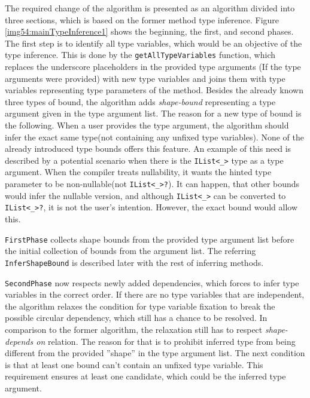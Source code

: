 The required change of the algorithm is presented as an algorithm divided into three sections, which is based on the former method type inference. 
Figure \ref{img54:mainTypeInference1} shows the beginning, the first, and second phases. 
The first step is to identify all type variables, which would be an objective of the type inference. 
This is done by the \texttt{getAllTypeVariables} function, which replaces the underscore placeholders in the provided type arguments (If the type arguments were provided) with new type variables and joins them with type variables representing type parameters of
the method.
Besides the already known three types of bound, the algorithm adds \textit{shape-bound} representing a type argument given in the type argument list.
The reason for a new type of bound is the following. 
When a user provides the type argument, the algorithm should infer the exact same type(not containing any unfixed type variables). 
None of the already introduced type bounds offers this feature. 
An example of this need is described by a potential scenario when there is the \texttt{IList<\_>} type as a type argument. 
When the compiler treats nullability, it wants the hinted type parameter to be non-nullable(not \texttt{IList<\_>?}). 
It can happen, that other bounds would infer the nullable version, and although \texttt{IList<\_>} can be
converted to \texttt{IList<\_>?}, it is not the user’s intention. 
However, the exact bound would allow this.
\par
\texttt{FirstPhase} collects shape bounds from the provided type argument list before the initial  collection of bounds from the argument list.
The referring \texttt{InferShapeBound} is described later with the rest of inferring methods.
\par
\texttt{SecondPhase} now respects newly added dependencies, which forces to infer type variables in the correct order. 
If there are no type variables that are independent, the algorithm relaxes the condition for type variable fixation to break the possible circular dependency, which still has a chance to be resolved. 
In comparison to the former algorithm, the relaxation still has to respect \textit{shape-depends on} relation. 
The reason for that is to prohibit inferred type from being different from the provided ”shape” in the type argument list. 
The next condition is that at least one bound can’t contain an unfixed type variable. 
This requirement ensures at least one candidate, which could be the inferred type argument.
